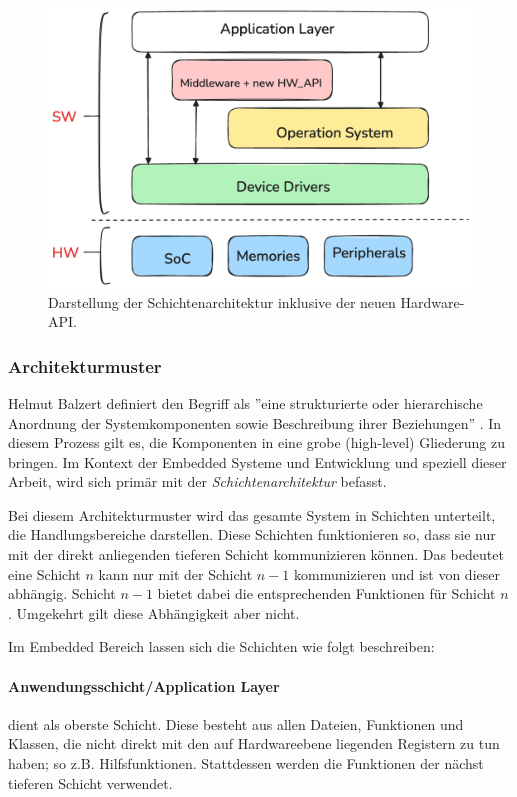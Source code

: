 \begin{figure}[H]
	\includegraphics[width=\textwidth]{Pics/layer_architecture_hw_api.png}
	\caption{Darstellung der Schichtenarchitektur inklusive der neuen Hardware-API.}
	\label{fig:layer_architecture_hw_api}
\end{figure}

\subsubsection{Architekturmuster}
Helmut Balzert definiert den Begriff als ''eine strukturierte oder hierarchische Anordnung der Systemkomponenten sowie Beschreibung ihrer Beziehungen'' \cite{balzert2011softwaretechnik2}.
In diesem Prozess gilt es, die Komponenten in eine grobe (high-level) Gliederung zu bringen.
Im Kontext der Embedded Systeme und Entwicklung und speziell dieser Arbeit, wird sich primär mit der \emph{Schichtenarchitektur} befasst.

Bei diesem Architekturmuster wird das gesamte System in Schichten unterteilt, die  Handlungsbereiche darstellen.
Diese Schichten funktionieren so, dass sie nur mit der direkt anliegenden tieferen Schicht kommunizieren können.
Das bedeutet eine Schicht $n$ kann nur mit der Schicht $n-1$ kommunizieren und ist von dieser abhängig.
Schicht $n-1$ bietet dabei die entsprechenden Funktionen für Schicht $n$.
Umgekehrt gilt diese Abhängigkeit aber nicht.

Im Embedded Bereich lassen sich die Schichten wie folgt beschreiben:

\paragraph{Anwendungsschicht/Application Layer}
dient als oberste Schicht.
Diese besteht aus allen Dateien, Funktionen und Klassen, die nicht direkt mit den auf Hardwareebene liegenden Registern zu tun haben; so z.B. Hilfsfunktionen.
Stattdessen werden die Funktionen der nächst tieferen Schicht verwendet.

